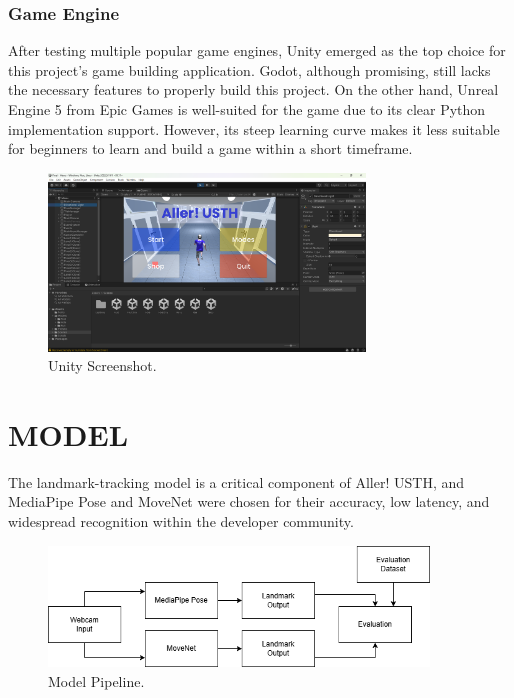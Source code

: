 \documentclass[12pt]{article}
\begin{document}
\subsubsection{Game Engine}
After testing multiple popular game engines, Unity emerged as the top choice for this project's game building application. Godot, although promising, still lacks the necessary features to properly build this project. On the other hand, Unreal Engine 5 from Epic Games is well-suited for the game due to its clear Python implementation support. However, its steep learning curve makes it less suitable for beginners to learn and build a game within a short timeframe.
\begin{figure}[ht]
    \centering
    \includegraphics[width=0.75\textwidth]{unity.png}
    \caption{Unity Screenshot.}
\end{figure}
\clearpage

\section{MODEL}
\hspace*{1.5em}The landmark-tracking model is a critical component of Aller! USTH, and MediaPipe Pose and MoveNet were chosen for their accuracy, low latency, and widespread recognition within the developer community.\\

\begin{figure}[ht]
    \centering
    \includegraphics[width=0.9\textwidth]{ModelEva.drawio.png}
    \caption{Model Pipeline.}
\end{figure}
\end{document}
